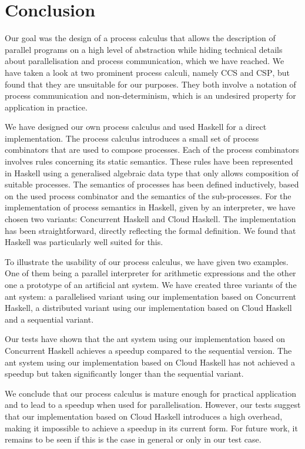 \chapter{Conclusion}
\vspace*{-0.5em}
Our goal was the design of a process calculus that allows the description of parallel programs on a high level of abstraction while hiding technical details about parallelisation and process communication, which we have reached. We have taken a look at two prominent process calculi, namely \textsc{CCS} and \textsc{CSP}, but found that they are unsuitable for our purposes. They both involve a notation of process communication and non-determinism, which is an undesired property for application in practice.

\vspace*{-0.25em}
We have designed our own process calculus and used \textsf{Haskell} for a direct implementation. The process calculus introduces a small set of process combinators that are used to compose processes. Each of the process combinators involves rules concerning its static semantics. These rules have been represented in \textsf{Haskell} using a generalised algebraic data type that only allows composition of suitable processes. The semantics of processes has been defined inductively, based on the used process combinator and the semantics of the sub-processes. For the implementation of process semantics in \textsf{Haskell}, given by an interpreter, we have chosen two variants: \textsf{Concurrent Haskell} and \textsf{Cloud Haskell}. The implementation has been straightforward, directly reflecting the formal definition. We found that \textsf{Haskell} was particularly well suited for this.

\vspace*{-0.25em}
To illustrate the usability of our process calculus, we have given two examples. One of them being a parallel interpreter for arithmetic expressions and the other one a prototype of an artificial ant system. We have created three variants of the ant system: a parallelised variant using our implementation based on \textsf{Concurrent Haskell}, a distributed variant using our implementation based on \textsf{Cloud Haskell} and a sequential variant.

\vspace*{-0.25em}
Our tests have shown that the ant system using our implementation based on \textsf{Concurrent Haskell} achieves a speedup compared to the sequential version. The ant system using our implementation based on \textsf{Cloud Haskell} has not achieved a speedup but taken significantly longer than the sequential variant. 

\vspace*{-0.25em}
We conclude that our process calculus is mature enough for practical application and to lead to a speedup when used for parallelisation. However, our tests suggest that our implementation based on \textsf{Cloud Haskell} introduces a high overhead, making it impossible to achieve a speedup in its current form. For future work, it remains to be seen if this is the case in general or only in our test case.
\vspace*{-0.5em}